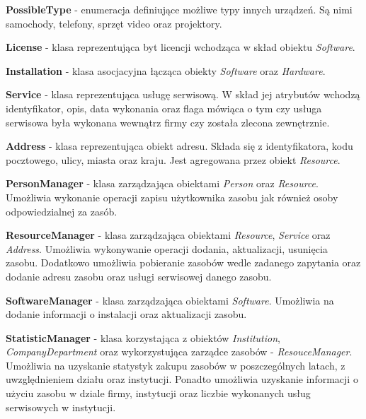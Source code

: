\begin{description}
	\item \textbf{PossibleType} - enumeracja definiujące możliwe typy innych urządzeń. Są nimi samochody, telefony, sprzęt video oraz projektory.
	
	\item \textbf{License} - klasa reprezentująca byt licencji wchodząca w skład obiektu \textit{Software}.
	
	\item \textbf{Installation} - klasa asocjacyjna łącząca obiekty \textit{Software} oraz \textit{Hardware}.
	
	\item \textbf{Service} - klasa reprezentująca usługę serwisową. W skład jej atrybutów wchodzą identyfikator, opis, data wykonania oraz flaga mówiąca o tym czy usługa serwisowa była wykonana wewnątrz firmy czy została zlecona zewnętrznie.
	
	\item \textbf{Address} - klasa reprezentująca obiekt adresu. Składa się z identyfikatora, kodu pocztowego, ulicy, miasta oraz kraju. Jest agregowana przez obiekt \textit{Resource}.
	
	\item \textbf{PersonManager} - klasa zarządzająca obiektami \textit{Person} oraz \textit{Resource}. Umożliwia wykonanie operacji zapisu użytkownika zasobu jak również osoby odpowiedzialnej za zasób.
	
	\item \textbf{ResourceManager} - klasa zarządzająca obiektami \textit{Resource}, \textit{Service} oraz \textit{Address}. Umożliwia wykonywanie operacji dodania, aktualizacji, usunięcia zasobu. Dodatkowo umożliwia pobieranie zasobów wedle zadanego zapytania oraz dodanie adresu zasobu oraz usługi serwisowej danego zasobu. 
		
	\item \textbf{SoftwareManager} - klasa zarządzająca obiektami \textit{Software}. Umożliwia na dodanie informacji o instalacji oraz aktualizacji zasobu.
			
	\item \textbf{StatisticManager} - klasa korzystająca z obiektów \textit{Institution}, \textit{CompanyDepartment} oraz wykorzystująca zarządce zasobów - \textit{ResouceManager}. Umożliwia na uzyskanie statystyk zakupu zasobów w poszczególnych latach, z uwzględnieniem działu oraz instytucji. Ponadto umożliwia uzyskanie informacji o użyciu zasobu w dziale firmy, instytucji oraz liczbie wykonanych usług serwisowych w instytucji.
\end{description}

